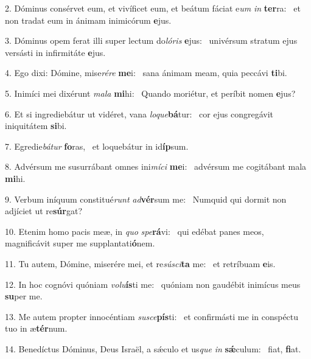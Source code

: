 2. Dóminus consérvet eum, et vivíficet eum, et beátum fáciat e\textit{um} \textit{in} \textbf{ter}ra: \ast\  et non tradat eum in ánimam inimicórum \textbf{e}jus.\

3. Dóminus opem ferat illi super lectum do\textit{ló}\textit{ris} \textbf{e}jus: \ast\  univérsum stratum ejus versásti in infirmitáte \textbf{e}jus.\

4. Ego dixi: Dómine, mise\textit{ré}\textit{re} \textbf{me}i: \ast\  sana ánimam meam, quia peccávi \textbf{ti}bi.\

5. Inimíci mei dixérunt \textit{ma}\textit{la} \textbf{mi}hi: \ast\  Quando moriétur, et períbit nomen \textbf{e}jus?\

6. Et si ingrediebátur ut vidéret, vana \textit{lo}\textit{que}\textbf{bá}tur: \ast\  cor ejus congregávit iniquitátem \textbf{si}bi.\

7. Egredie\textit{bá}\textit{tur} \textbf{fo}ras, \ast\  et loquebátur in id\textbf{íp}sum.\

8. Advérsum me susurrábant omnes ini\textit{mí}\textit{ci} \textbf{me}i: \ast\  advérsum me cogitábant mala \textbf{mi}hi.\

9. Verbum iníquum constitué\textit{runt} \textit{ad}\textbf{vér}sum me: \ast\  Numquid qui dormit non adjíciet ut re\textbf{súr}gat?\

10. Etenim homo pacis meæ, in \textit{quo} \textit{spe}\textbf{rá}vi: \ast\  qui edébat panes meos, magnificávit super me supplantati\textbf{ó}nem.\

11. Tu autem, Dómine, miserére mei, et re\textit{sú}\textit{sci}\textbf{ta} me: \ast\  et retríbuam \textbf{e}is.\

12. In hoc cognóvi quóniam \textit{vo}\textit{lu}\textbf{ís}ti me: \ast\  quóniam non gaudébit inimícus meus \textbf{su}per me.\

13. Me autem propter innocéntiam \textit{su}\textit{sce}\textbf{pís}ti: \ast\  et confirmásti me in conspéctu tuo in æ\textbf{tér}num.\

14. Benedíctus Dóminus, Deus Israël, a sǽculo et us\textit{que} \textit{in} \textbf{sǽ}culum: \ast\  fiat, \textbf{fi}at.\

